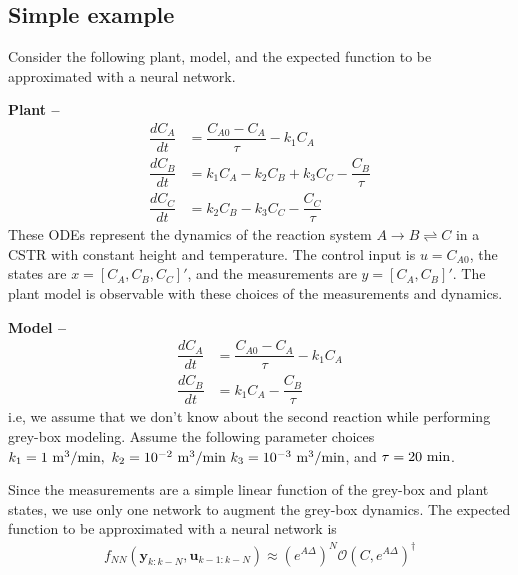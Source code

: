 \documentclass{article}
\begin{document}
\subsection{Simple example}

Consider the following plant, model,
and the expected function to be approximated 
with a neural network.

\textbf{Plant --}
\begin{align*}
  \dfrac{dC_A}{dt} &= \dfrac{C_{A0} - C_A}{\tau} - k_1C_A\\
  \dfrac{dC_B}{dt} &= k_1C_A - k_2C_B + k_3C_C- \dfrac{C_B}{\tau}\\
  \dfrac{dC_C}{dt} &= k_2C_B - k_3C_C - \dfrac{C_C}{\tau}
\end{align*}
These ODEs represent the dynamics of the reaction system
$A \rightarrow B \rightleftharpoons C$ in a CSTR with constant 
height and temperature. The control input is $u = C_{A0}$,
the states are $x = [C_A, C_B, C_C]'$, 
and the measurements are $y = [C_A, C_B]'$. The plant model 
is observable with these choices of the measurements and dynamics.

\textbf{Model --}
\begin{align*}
  \dfrac{dC_A}{dt} &= \dfrac{C_{A0} - C_A}{\tau} - k_1C_A\\
  \dfrac{dC_B}{dt} &= k_1C_A - \dfrac{C_B}{\tau}
\end{align*}
i.e, we assume that we don't know about the second reaction while 
performing grey-box modeling. Assume the following 
parameter choices $k_1 = 1 \ \textnormal{m}^3/\textnormal{min}, 
\ k_2 = 10^{-2} \ \textnormal{m}^3/\textnormal{min}
\ k_3 = 10^{-3} \ \textnormal{m}^3/\textnormal{min}$, 
and $\tau = 20 \ \textnormal{min}$. 

Since the measurements are a simple linear function 
of the grey-box and plant states, we use only one network to 
augment the grey-box dynamics. The expected function 
to be approximated with a neural network is
\begin{align}
  f_{NN}(\mathbf{y}_{k:k-N}, \mathbf{u}_{k-1:k-N}) \approx (e^{A\Delta})^N
  \mathcal{O}(C, e^{A\Delta})^{\dagger}
\end{align}

 
\end{document}
